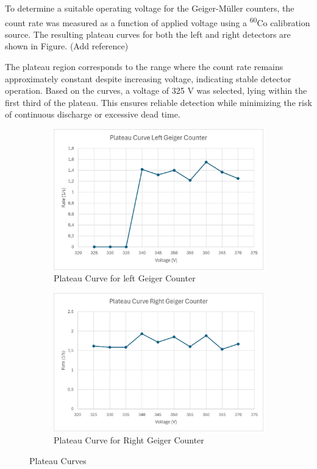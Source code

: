 \documentclass[12pt,a4paper]{article}
\begin{document}
To determine a suitable operating voltage for the Geiger-Müller counters, the count rate was measured as a function of applied voltage using a \textsuperscript{60}Co calibration source. The resulting plateau curves for both the left and right detectors are shown in Figure. (Add reference) 

The plateau region corresponds to the range where the count rate remains approximately constant despite increasing voltage, indicating stable detector operation. Based on the curves, a voltage of 325 V was selected, lying within the first third of the plateau. This ensures reliable detection while minimizing the risk of continuous discharge or excessive dead time.

\begin{figure}[H]
  \centering
  \begin{subfigure}{0.49\textwidth}
    \includegraphics[width=\textwidth]{./Pictures/left_GC.png}
    \caption{Plateau Curve for left Geiger Counter}
  \end{subfigure}
  \begin{subfigure}{0.49\textwidth}
    \includegraphics[width=\textwidth]{./Pictures/right_GC.png}
    \caption{Plateau Curve for Right Geiger Counter}
  \end{subfigure}
  \caption{Plateau Curves}
  \label{fig:l}
\end{figure}
\end{document}
